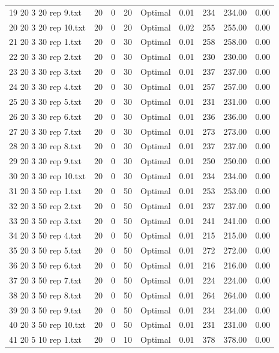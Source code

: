 \begin{longtable}{lrrllrrrr}
19 20 3 20 rep 9.txt & 20 & 0 & 20 & Optimal &  0.01 & 234 & 234.00 &  0.00\\
20 20 3 20 rep 10.txt & 20 & 0 & 20 & Optimal &  0.02 & 255 & 255.00 &  0.00\\
21 20 3 30 rep 1.txt & 20 & 0 & 30 & Optimal &  0.01 & 258 & 258.00 &  0.00\\
22 20 3 30 rep 2.txt & 20 & 0 & 30 & Optimal &  0.01 & 230 & 230.00 &  0.00\\
23 20 3 30 rep 3.txt & 20 & 0 & 30 & Optimal &  0.01 & 237 & 237.00 &  0.00\\
24 20 3 30 rep 4.txt & 20 & 0 & 30 & Optimal &  0.01 & 257 & 257.00 &  0.00\\
25 20 3 30 rep 5.txt & 20 & 0 & 30 & Optimal &  0.01 & 231 & 231.00 &  0.00\\
26 20 3 30 rep 6.txt & 20 & 0 & 30 & Optimal &  0.01 & 236 & 236.00 &  0.00\\
27 20 3 30 rep 7.txt & 20 & 0 & 30 & Optimal &  0.01 & 273 & 273.00 &  0.00\\
28 20 3 30 rep 8.txt & 20 & 0 & 30 & Optimal &  0.01 & 237 & 237.00 &  0.00\\
29 20 3 30 rep 9.txt & 20 & 0 & 30 & Optimal &  0.01 & 250 & 250.00 &  0.00\\
30 20 3 30 rep 10.txt & 20 & 0 & 30 & Optimal &  0.01 & 234 & 234.00 &  0.00\\
31 20 3 50 rep 1.txt & 20 & 0 & 50 & Optimal &  0.01 & 253 & 253.00 &  0.00\\
32 20 3 50 rep 2.txt & 20 & 0 & 50 & Optimal &  0.01 & 237 & 237.00 &  0.00\\
33 20 3 50 rep 3.txt & 20 & 0 & 50 & Optimal &  0.01 & 241 & 241.00 &  0.00\\
34 20 3 50 rep 4.txt & 20 & 0 & 50 & Optimal &  0.01 & 215 & 215.00 &  0.00\\
35 20 3 50 rep 5.txt & 20 & 0 & 50 & Optimal &  0.01 & 272 & 272.00 &  0.00\\
36 20 3 50 rep 6.txt & 20 & 0 & 50 & Optimal &  0.01 & 216 & 216.00 &  0.00\\
37 20 3 50 rep 7.txt & 20 & 0 & 50 & Optimal &  0.01 & 224 & 224.00 &  0.00\\
38 20 3 50 rep 8.txt & 20 & 0 & 50 & Optimal &  0.01 & 264 & 264.00 &  0.00\\
39 20 3 50 rep 9.txt & 20 & 0 & 50 & Optimal &  0.01 & 234 & 234.00 &  0.00\\
40 20 3 50 rep 10.txt & 20 & 0 & 50 & Optimal &  0.01 & 231 & 231.00 &  0.00\\
41 20 5 10 rep 1.txt & 20 & 0 & 10 & Optimal &  0.01 & 378 & 378.00 &  0.00\\

\end{longtable}
